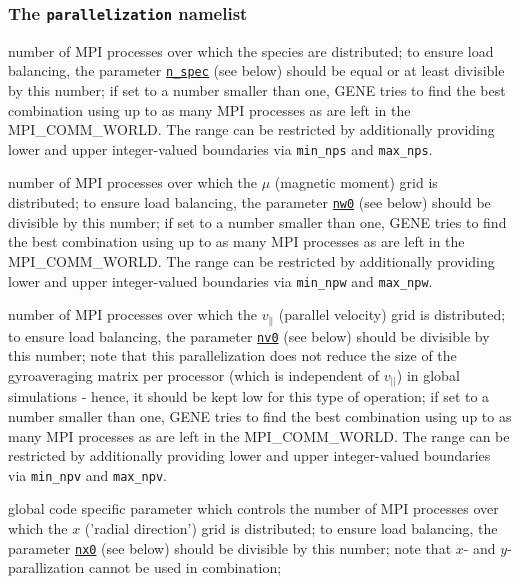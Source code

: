 \documentclass[12pt]{article}
\begin{document}
\subsubsection{The \texttt{parallelization} namelist}
\begin{description}
\hypertarget{parallelization_nml}{}
\item[\texttt{n\_procs\_s [int 1]:}] number of MPI processes over which the species are distributed;
to ensure load balancing, the parameter \hyperlink{n_spec}{\tt n\_spec} (see below) should be equal or at least divisible
by this number;
if set to a number smaller than one, GENE tries to find the best combination using up to as many
MPI processes as are left in the MPI\_COMM\_WORLD. The range can be restricted by additionally providing
lower and upper integer-valued boundaries via \texttt{min\_nps} and \texttt{max\_nps}.
\item[\texttt{n\_procs\_w [int 1]:}] number of MPI processes over which the $\mu$ (magnetic moment) grid
is distributed; to ensure load balancing, the parameter \hyperlink{nw0}{\tt nw0} (see below) should be divisible by
this number;
if set to a number smaller than one, GENE tries to find the best combination using up to as many
MPI processes as are left in the MPI\_COMM\_WORLD. The range can be restricted by additionally providing
lower and upper integer-valued boundaries via \texttt{min\_npw} and \texttt{max\_npw}.
\item[\texttt{n\_procs\_v [int 1]:}] number of MPI processes over which the $v_{\parallel}$ (parallel
velocity) grid is distributed; to ensure load balancing, the parameter \hyperlink{nv0}{\tt nv0} (see below) should
be divisible by this number; note that this parallelization does not reduce the size of the
gyroaveraging matrix per processor (which is independent of $v_{||}$) in global simulations - hence, it
should be kept low for this type of operation;
if set to a number smaller than one, GENE tries to find the best combination using up to as many
MPI processes as are left in the MPI\_COMM\_WORLD. The range can be restricted by additionally providing
lower and upper integer-valued boundaries via \texttt{min\_npv} and \texttt{max\_npv}.
\item[\texttt{n\_procs\_x [int 1]:}] global code specific parameter which controls the
number of MPI processes over which the $x$ ('radial direction') grid is distributed;
to ensure load balancing, the parameter \hyperlink{nx0}{\tt nx0} (see below) should be divisible
by this number; note that $x$- and $y$-parallization cannot be used in combination;

\end{description}
\end{document}
